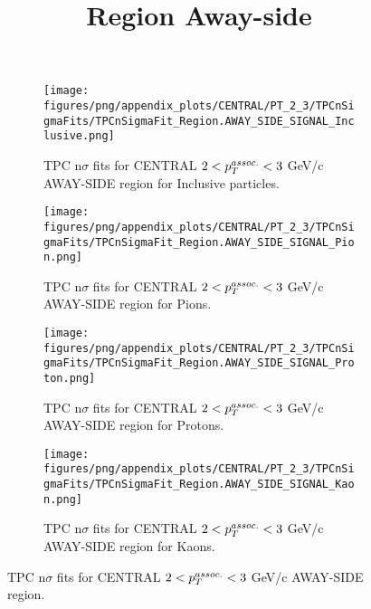             \begin{figure}[H]
                \title{Region Away-side}
                \begin{subfigure}[b]{0.5\textwidth}
                    \centering
                    \texttt{[image: figures/png/appendix\_plots/CENTRAL/PT\_2\_3/TPCnSigmaFits/TPCnSigmaFit\_Region.AWAY\_SIDE\_SIGNAL\_Inclusive.png]}
                    \caption{TPC n$\sigma$ fits for CENTRAL $2 < \pTassoc < 3$ GeV/c AWAY-SIDE region for Inclusive particles.}
                    \label{fig:appendix_CENTRAL_$2 < \pTassoc < 3$ GeV/c_AWAY_SIDE_SIGNAL_Inclusive}
                \end{subfigure}
                \begin{subfigure}[b]{0.5\textwidth}
                    \centering
                    \texttt{[image: figures/png/appendix\_plots/CENTRAL/PT\_2\_3/TPCnSigmaFits/TPCnSigmaFit\_Region.AWAY\_SIDE\_SIGNAL\_Pion.png]}
                    \caption{TPC n$\sigma$ fits for CENTRAL $2 < \pTassoc < 3$ GeV/c AWAY-SIDE region for Pions.}
                    \label{fig:appendix_CENTRAL_$2 < \pTassoc < 3$ GeV/c_AWAY_SIDE_SIGNAL_Pion}
                \end{subfigure}
                \begin{subfigure}[b]{0.5\textwidth}
                    \centering
                    \texttt{[image: figures/png/appendix\_plots/CENTRAL/PT\_2\_3/TPCnSigmaFits/TPCnSigmaFit\_Region.AWAY\_SIDE\_SIGNAL\_Proton.png]}
                    \caption{TPC n$\sigma$ fits for CENTRAL $2 < \pTassoc < 3$ GeV/c AWAY-SIDE region for Protons.}
                    \label{fig:appendix_CENTRAL_$2 < \pTassoc < 3$ GeV/c_AWAY_SIDE_SIGNAL_Proton}
                \end{subfigure}
                \begin{subfigure}[b]{0.5\textwidth}
                    \centering
                    \texttt{[image: figures/png/appendix\_plots/CENTRAL/PT\_2\_3/TPCnSigmaFits/TPCnSigmaFit\_Region.AWAY\_SIDE\_SIGNAL\_Kaon.png]}
                    \caption{TPC n$\sigma$ fits for CENTRAL $2 < \pTassoc < 3$ GeV/c AWAY-SIDE region for Kaons.}
                    \label{fig:appendix_CENTRAL_$2 < \pTassoc < 3$ GeV/c_AWAY_SIDE_SIGNAL_Kaon}
                \end{subfigure}
                \caption{TPC n$\sigma$ fits for CENTRAL $2 < \pTassoc < 3$ GeV/c AWAY-SIDE region.}
                \label{fig:appendix_CENTRAL_$2 < \pTassoc < 3$ GeV/c_AWAY_SIDE_SIGNAL}
            \end{figure}
